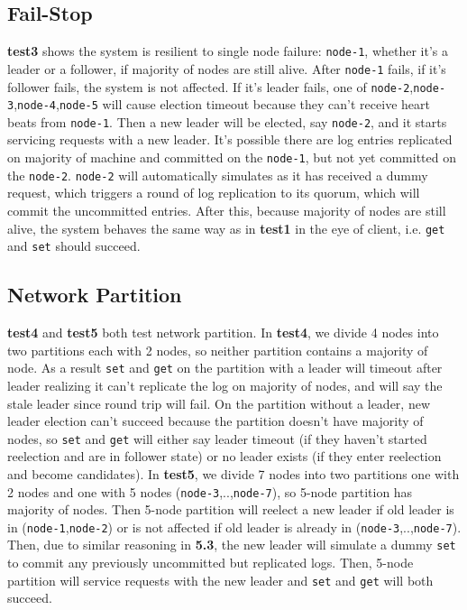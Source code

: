 \documentclass[11pt]{article}
\begin{document}
\subsection{Fail-Stop}
{\bf test3} shows the system is resilient to single node failure: \texttt{node-1}, whether it's a leader or a follower, if majority of nodes are still alive. After \texttt{node-1} fails, if it's follower fails, the system is not affected. If it's leader fails, one of \texttt{node-2},\texttt{node-3},\texttt{node-4},\texttt{node-5} will cause election timeout because they can't receive heart beats from \texttt{node-1}. Then a new leader will be elected, say \texttt{node-2}, and it starts servicing requests with a new leader. It's possible there are log entries replicated on majority of machine and committed on the \texttt{node-1}, but not yet committed on the \texttt{node-2}. \texttt{node-2} will automatically simulates as it has received a dummy  request, which triggers a round of log replication to its quorum, which will commit the uncommitted entries. After this, because majority of nodes are still alive, the system behaves the same way as in {\bf test1} in the eye of client, i.e. \texttt{get} and \texttt{set} should succeed. 


\subsection{Network Partition}
{\bf test4} and {\bf test5} both test network partition. In {\bf test4}, we divide 4 nodes into two partitions each with 2 nodes, so neither partition contains a majority of node. As a result \texttt{set} and \texttt{get} on the partition with a leader will timeout after leader realizing it can't replicate the log on majority of nodes, and will say the stale leader since round trip will fail. On the partition without a leader, new leader election can't succeed because the partition doesn't have majority of nodes, so \texttt{set} and \texttt{get} will either say leader timeout (if they haven't started reelection and are in follower state) or no leader exists (if they enter reelection and become candidates). In {\bf test5}, we divide 7 nodes into two partitions one with 2 nodes and one with 5 nodes (\texttt{node-3},..,\texttt{node-7}), so 5-node partition has majority of nodes. Then 5-node partition will reelect a new leader if old leader is in (\texttt{node-1},\texttt{node-2}) or is not affected if old leader is already in (\texttt{node-3},..,\texttt{node-7}). Then, due to similar reasoning in {\bf 5.3}, the new leader will simulate a dummy \texttt{set} to commit any previously uncommitted but replicated logs. Then, 5-node partition will service requests with the new leader and \texttt{set} and \texttt{get} will both succeed.
\end{document}
